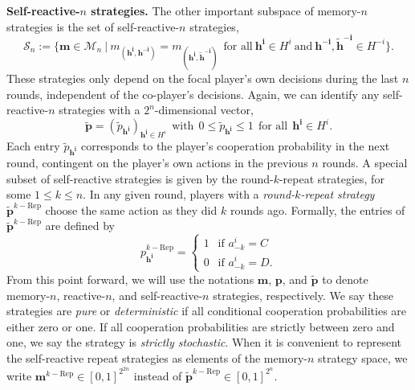 \documentclass[11pt]{article}
\theoremstyle{plainCl1}
\theoremstyle{plainCl2}
\begin{document}
\noindent
{\bfseries Self-reactive-$n$ strategies.}
The other important subspace of memory-$n$ strategies is the set of self-reactive-$n$ strategies, 
\begin{equation}
\mathcal{S}_n:=\Big\{ \mathbf{m}\!\in\!\mathcal{M}_n ~\Big|~ m_{(\mathbf{h^i},\mathbf{h^{-i}})}\!=\!m_{(\mathbf{h^i},\mathbf{\tilde h^{-i}})}~~\text{for all}~\mathbf{h^i}\!\in\!H^i~\text{and}~\mathbf{h^{-i}},\mathbf{\tilde h^{-i}}\!\in\!H^{-i}\Big\}.
\end{equation}
These strategies only depend on the focal player's own decisions during the last $n$ rounds, independent of the co-player's decisions. 
Again, we can identify any self-reactive-$n$ strategies with a $2^n$-dimensional vector, 
\begin{equation}
\mathbf{\tilde{p}} = (\tilde{p}_\mathbf{h^{i}})_{\mathbf{h^{i}} \in H^i}  ~~\text{with}~~ 0\!\le\!\tilde p_\mathbf{h^i}\!\le\!1 ~~\text{for all}~~ \mathbf{h^i}\!\in\! H^i.
\end{equation}
Each entry $\tilde{p}_{\mathbf{h^{i}}}$ corresponds to the player's cooperation
probability in the next round, contingent on the player's own actions in
the previous $n$ rounds.
A special subset of self-reactive strategies is given by the round-$k$-repeat strategies, for some $1\le
k\le n$. 
In any given round, players with a {\it round-$k$-repeat strategy} $\mathbf{\tilde p}^{k-\text{Rep}}$ choose the same action as they did $k$ rounds ago. 
Formally, the entries of $\mathbf{\tilde p}^{k-\text{Rep}}$ are defined by
\begin{equation} \label{Eq:Repeat}
p^{k-\text{Rep}}_\mathbf{h^i} =
\left\{
\begin{array}{l}
1~~ \text{ if } a^i_{-k}\!=\!C\\[0.1cm]
0~~ \text{ if } a^i_{-k}\!=\!D.
\end{array}
\right.
\end{equation}
From this point forward, we will use the notations $\mathbf{m}$, $\mathbf{p}$,
and $\mathbf{\tilde{p}}$ to denote memory-$n$, reactive-$n$, and
self-reactive-$n$ strategies, respectively. 
We say these strategies are {\it pure} or {\it deterministic} if all conditional cooperation probabilities are either zero or one. 
If all cooperation probabilities are strictly between zero and one, we say the strategy is {\it strictly stochastic}. 
When it is convenient to represent the self-reactive repeat strategies as elements of the memory-$n$ strategy space, we write $\mathbf{m}^{k-\text{Rep}}\!\in\![0,1]^{2^{2n}}$ instead of $\mathbf{\tilde p}^{k-\text{Rep}}\!\in\![0,1]^{2^n}$.
\end{document}
